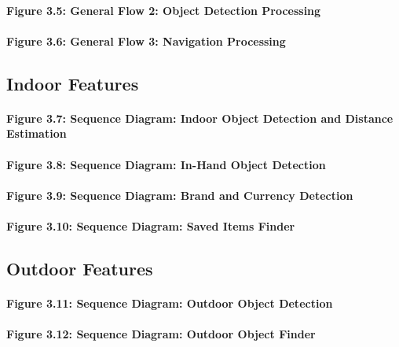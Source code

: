 \documentclass[12pt,a4paper]{report}
\begin{document}
\paragraph*{Figure 3.5: General Flow 2: Object Detection Processing}

\paragraph*{Figure 3.6: General Flow 3: Navigation Processing}

\subsection{Indoor Features}

\paragraph*{Figure 3.7: Sequence Diagram: Indoor Object Detection and Distance Estimation}

\paragraph*{Figure 3.8: Sequence Diagram: In-Hand Object Detection}

\paragraph*{Figure 3.9: Sequence Diagram: Brand and Currency Detection}

\paragraph*{Figure 3.10: Sequence Diagram: Saved Items Finder}

\subsection{Outdoor Features}

\paragraph*{Figure 3.11: Sequence Diagram: Outdoor Object Detection}

\paragraph*{Figure 3.12: Sequence Diagram: Outdoor Object Finder}
\end{document}

